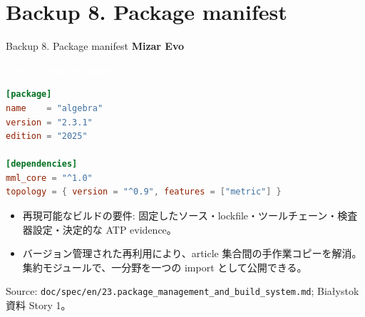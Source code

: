 \documentclass[dvipdfmx,aspectratio=169,11pt]{beamer}
\newcommand{\statusbadge}[2]{\colorbox{#1}{\textcolor{white}{\strut\scriptsize\sffamily\bfseries #2}}}
\newcommand{\badgeSpec}{\statusbadge{green!35!black}{specification example}}
\begin{document}
\section{Backup 8. Package manifest}
\begin{frame}[fragile,t]{Backup 8. Package manifest}
\smallskip
\textbf{Mizar Evo}~\badgeSpec
\begin{lstlisting}[language={toml},basicstyle=\ttfamily\footnotesize]
[package]
name    = "algebra"
version = "2.3.1"
edition = "2025"

[dependencies]
mml_core = "^1.0"
topology = { version = "^0.9", features = ["metric"] }
\end{lstlisting}
\begin{itemize}
\setlength{\itemsep}{1pt}
\setlength{\parsep}{0pt}
\setlength{\parskip}{0pt}
\item 再現可能なビルドの要件: 固定したソース・lockfile・ツールチェーン・検査器設定・決定的な ATP evidence。
\item バージョン管理された再利用により、article 集合間の手作業コピーを解消。集約モジュールで、一分野を一つの import として公開できる。
\end{itemize}
Source: \texttt{doc/spec/en/23.package\_management\_and\_build\_system.md}; Bia\l{}ystok 資料 Story 1。

\end{frame}
\end{document}
